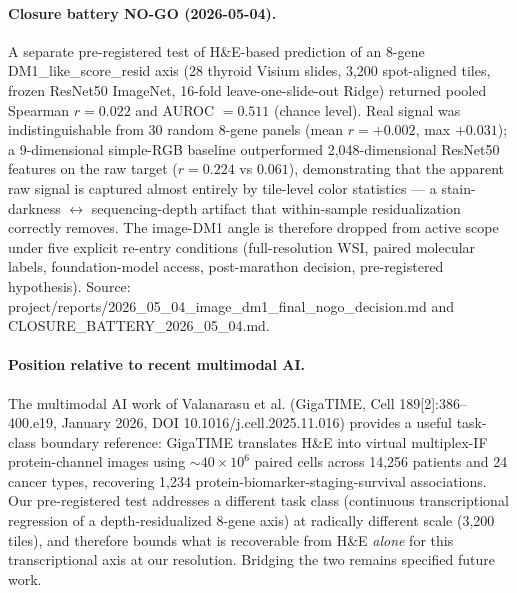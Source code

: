 \documentclass[11pt,a4paper]{article}
\begin{document}
\paragraph{Closure battery NO-GO (2026-05-04).} A separate
pre-registered test of H\&E-based prediction of an 8-gene
DM1\_like\_score\_resid axis (28 thyroid Visium slides, 3,200
spot-aligned tiles, frozen ResNet50 ImageNet, 16-fold
leave-one-slide-out Ridge) returned pooled Spearman $r = 0.022$
and AUROC $= 0.511$ (chance level). Real signal was indistinguishable
from 30 random 8-gene panels (mean $r = +0.002$, max $+0.031$);
a 9-dimensional simple-RGB baseline outperformed 2,048-dimensional
ResNet50 features on the raw target ($r = 0.224$ vs $0.061$),
demonstrating that the apparent raw signal is captured almost
entirely by tile-level color statistics --- a stain-darkness $\leftrightarrow$
sequencing-depth artifact that within-sample residualization
correctly removes. The image-DM1 angle is therefore dropped from
active scope under five explicit re-entry conditions (full-resolution
WSI, paired molecular labels, foundation-model access, post-marathon
decision, pre-registered hypothesis). Source:
project/reports/2026\_05\_04\_image\_dm1\_final\_nogo\_decision.md
and CLOSURE\_BATTERY\_2026\_05\_04.md.

\paragraph{Position relative to recent multimodal AI.} The
multimodal AI work of Valanarasu et al. (GigaTIME, Cell
189[2]:386--400.e19, January 2026, DOI 10.1016/j.cell.2025.11.016)
provides a useful task-class boundary reference: GigaTIME translates
H\&E into virtual multiplex-IF protein-channel images using
${\sim}40 \times 10^6$ paired cells across 14,256 patients and 24
cancer types, recovering 1,234 protein-biomarker-staging-survival
associations. Our pre-registered test addresses a different task
class (continuous transcriptional regression of a depth-residualized
8-gene axis) at radically different scale (3,200 tiles), and
therefore bounds what is recoverable from H\&E \emph{alone} for
this transcriptional axis at our resolution. Bridging the two
remains specified future work.
\end{document}
